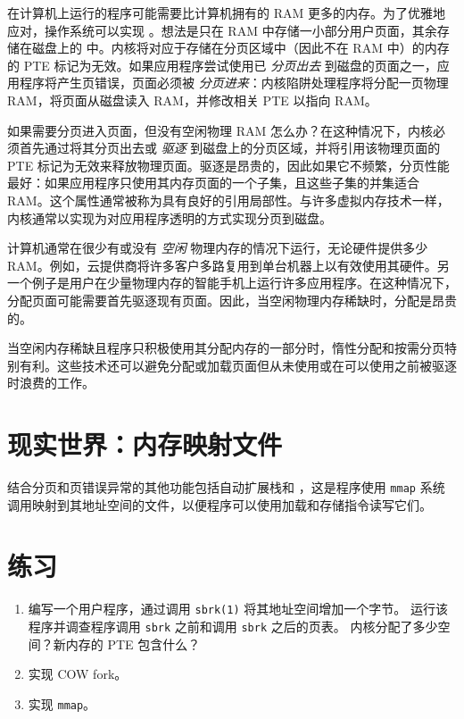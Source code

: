 在计算机上运行的程序可能需要比计算机拥有的 RAM 更多的内存。为了优雅地应对，操作系统可以实现 。想法是只在 RAM 中存储一小部分用户页面，其余存储在磁盘上的  中。内核将对应于存储在分页区域中（因此不在 RAM 中）的内存的 PTE 标记为无效。如果应用程序尝试使用已 \emph{分页出去} 到磁盘的页面之一，应用程序将产生页错误，页面必须被 \emph{分页进来}：内核陷阱处理程序将分配一页物理 RAM，将页面从磁盘读入 RAM，并修改相关 PTE 以指向 RAM。

如果需要分页进入页面，但没有空闲物理 RAM 怎么办？在这种情况下，内核必须首先通过将其分页出去或 \emph{驱逐} 到磁盘上的分页区域，并将引用该物理页面的 PTE 标记为无效来释放物理页面。驱逐是昂贵的，因此如果它不频繁，分页性能最好：如果应用程序只使用其内存页面的一个子集，且这些子集的并集适合 RAM。这个属性通常被称为具有良好的引用局部性。与许多虚拟内存技术一样，内核通常以实现为对应用程序透明的方式实现分页到磁盘。

计算机通常在很少有或没有 \emph{空闲} 物理内存的情况下运行，无论硬件提供多少 RAM。例如，云提供商将许多客户多路复用到单台机器上以有效使用其硬件。另一个例子是用户在少量物理内存的智能手机上运行许多应用程序。在这种情况下，分配页面可能需要首先驱逐现有页面。因此，当空闲物理内存稀缺时，分配是昂贵的。

当空闲内存稀缺且程序只积极使用其分配内存的一部分时，惰性分配和按需分页特别有利。这些技术还可以避免分配或加载页面但从未使用或在可以使用之前被驱逐时浪费的工作。

\section{现实世界：内存映射文件}

结合分页和页错误异常的其他功能包括自动扩展栈和 ，这是程序使用 \texttt{mmap} 系统调用映射到其地址空间的文件，以便程序可以使用加载和存储指令读写它们。


\section{练习}

\begin{enumerate}

\item 编写一个用户程序，通过调用
\lstinline{sbrk(1)}
将其地址空间增加一个字节。
运行该程序并调查程序调用
\lstinline{sbrk}
之前和调用
\lstinline{sbrk}
之后的页表。
内核分配了多少空间？新内存的
PTE
包含什么？

\item 实现 COW fork。

\item 实现 {\tt mmap}。

\end{enumerate}
